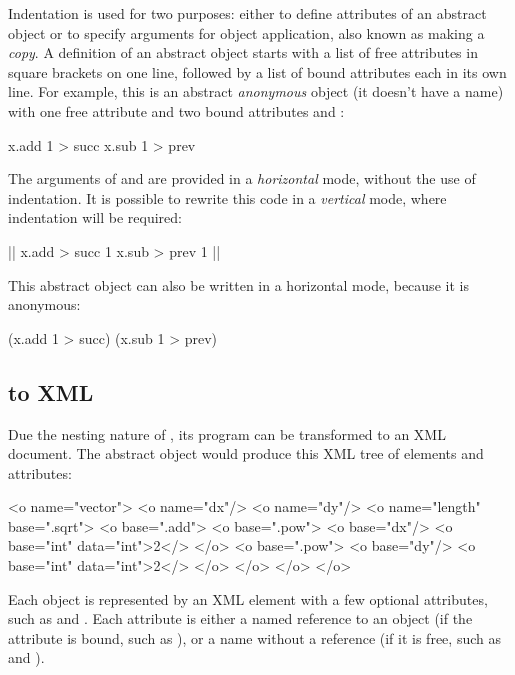 Indentation is used for two purposes: either to define attributes
of an abstract object or to specify arguments for object application, also
known as making a \emph{copy}.
A definition of an abstract object starts with a list of free attributes
in square brackets on one line, followed by a list of bound attributes
each in its own line. For example, this is an abstract \emph{anonymous} object
(it doesn't have a name)
with one free attribute  and two bound attributes  and :

\begin{ffcode}
[x]
  x.add 1 > succ
  x.sub 1 > prev
\end{ffcode}

The arguments of  and  are provided in a \emph{horizontal}
mode, without the use of indentation. It is possible to rewrite this code
in a \emph{vertical} mode, where indentation will be required:

\begin{ffcode}
[x] |$\label{ln:succ}$|
  x.add > succ
    1
  x.sub > prev
    1 |$\label{ln:succ-end}$|
\end{ffcode}

This abstract object can also be written in a horizontal mode,
because it is anonymous:

\begin{ffcode}
[x] (x.add 1 > succ) (x.sub 1 > prev)
\end{ffcode}

\subsection{\eo{} to XML}\label{sec:xml}

Due the nesting nature of \eo{}, its program can be transformed
to an XML document. The abstract object  would produce
this XML tree of elements and attributes:

\begin{ffcode}
<o name="vector">
  <o name="dx"/>
  <o name="dy"/>
  <o name="length" base=".sqrt">
    <o base=".add">
      <o base=".pow">
        <o base="dx"/>
        <o base="int" data="int">2</>
      </o>
      <o base=".pow">
        <o base="dy"/>
        <o base="int" data="int">2</>
      </o>
    </o>
  </o>
</o>
\end{ffcode}

Each object is represented by an  XML element with a few
optional attributes, such as  and . Each
attribute is either a named reference to an object (if the attribute is bound,
such as ), or a name without a reference (if it is free,
such as  and ).

